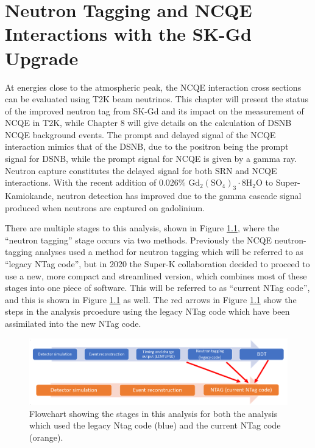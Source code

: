\chapter{Neutron Tagging and NCQE
Interactions with the SK-Gd Upgrade}
\label{chp:ncqegd}


At energies close to the atmospheric peak, the NCQE interaction cross sections can be evaluated using T2K beam neutrinos. This chapter will present the status of the improved neutron tag from SK-Gd and its impact on the measurement of NCQE in T2K, while Chapter 8 will give details on the calculation of DSNB NCQE background events. The prompt and delayed signal of the NCQE interaction mimics that of the DSNB, due to the positron being the prompt signal for DSNB, while the prompt signal for NCQE is given by a gamma ray. Neutron capture constitutes the delayed signal for both SRN and NCQE interactions. With the recent addition of 0.026\% $\mathrm{Gd}_{2}\left(\mathrm{SO}_{4}\right)_{3} \cdot 8 \mathrm{H}_{2} \mathrm{O}$ to Super-Kamiokande, neutron detection has improved due to the  gamma cascade signal produced when neutrons are captured on gadolinium. 

There are multiple stages to this analysis, shown in Figure \ref{fig:analysis_flowchart}, where the ``neutron tagging'' stage occurs via two methods. Previously the NCQE neutron-tagging analyses used a method for neutron tagging which will be referred to as ``legacy NTag code'', but in 2020 the Super-K collaboration decided to proceed to use a new, more compact and streamlined version, which combines most of these stages into one piece of software. This will be referred to as ``current NTag code'', and this is shown in Figure \ref{fig:analysis_flowchart} as well. The red arrows in Figure \ref{fig:analysis_flowchart} show the steps in the analysis prcoedure using the legacy NTag code which have been assimilated into the new NTag code.

\begin{figure}[htp]
    \includegraphics[width=\textwidth]{Figures/analysis_flowchart.png}
    \caption{Flowchart showing the stages in this analysis for both the analysis which used the legacy Ntag code (blue) and the current NTag code (orange).}
\label{fig:analysis_flowchart}
\end{figure}

